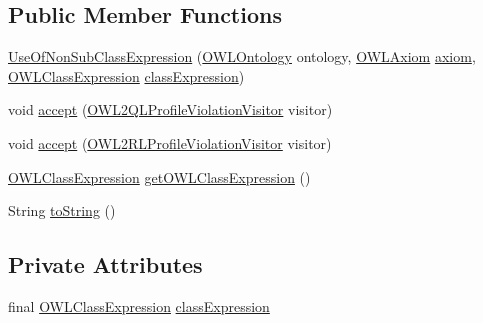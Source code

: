 \subsection*{Public Member Functions}
\begin{DoxyCompactItemize}
\item 
\hyperlink{classorg_1_1semanticweb_1_1owlapi_1_1profiles_1_1_use_of_non_sub_class_expression_aa1b02f795ea2d093cbc98c550f2ffc70}{Use\-Of\-Non\-Sub\-Class\-Expression} (\hyperlink{interfaceorg_1_1semanticweb_1_1owlapi_1_1model_1_1_o_w_l_ontology}{O\-W\-L\-Ontology} ontology, \hyperlink{interfaceorg_1_1semanticweb_1_1owlapi_1_1model_1_1_o_w_l_axiom}{O\-W\-L\-Axiom} \hyperlink{classorg_1_1semanticweb_1_1owlapi_1_1profiles_1_1_o_w_l_profile_violation_aa7c8e8910ed3966f64a2c003fb516214}{axiom}, \hyperlink{interfaceorg_1_1semanticweb_1_1owlapi_1_1model_1_1_o_w_l_class_expression}{O\-W\-L\-Class\-Expression} \hyperlink{classorg_1_1semanticweb_1_1owlapi_1_1profiles_1_1_use_of_non_sub_class_expression_a2904972a1c2a259d708005626ba9ff31}{class\-Expression})
\item 
void \hyperlink{classorg_1_1semanticweb_1_1owlapi_1_1profiles_1_1_use_of_non_sub_class_expression_a9051a12d41db68d4b911ec3e074b9022}{accept} (\hyperlink{interfaceorg_1_1semanticweb_1_1owlapi_1_1profiles_1_1_o_w_l2_q_l_profile_violation_visitor}{O\-W\-L2\-Q\-L\-Profile\-Violation\-Visitor} visitor)
\item 
void \hyperlink{classorg_1_1semanticweb_1_1owlapi_1_1profiles_1_1_use_of_non_sub_class_expression_abd322abca89ccbbec465c7fd32077238}{accept} (\hyperlink{interfaceorg_1_1semanticweb_1_1owlapi_1_1profiles_1_1_o_w_l2_r_l_profile_violation_visitor}{O\-W\-L2\-R\-L\-Profile\-Violation\-Visitor} visitor)
\item 
\hyperlink{interfaceorg_1_1semanticweb_1_1owlapi_1_1model_1_1_o_w_l_class_expression}{O\-W\-L\-Class\-Expression} \hyperlink{classorg_1_1semanticweb_1_1owlapi_1_1profiles_1_1_use_of_non_sub_class_expression_a2ebc835b03217cfafe01b2c84308292d}{get\-O\-W\-L\-Class\-Expression} ()
\item 
String \hyperlink{classorg_1_1semanticweb_1_1owlapi_1_1profiles_1_1_use_of_non_sub_class_expression_ade6ecfb94bea72cea20ae3f1aacc0d6f}{to\-String} ()
\end{DoxyCompactItemize}
\subsection*{Private Attributes}
\begin{DoxyCompactItemize}
\item 
final \hyperlink{interfaceorg_1_1semanticweb_1_1owlapi_1_1model_1_1_o_w_l_class_expression}{O\-W\-L\-Class\-Expression} \hyperlink{classorg_1_1semanticweb_1_1owlapi_1_1profiles_1_1_use_of_non_sub_class_expression_a2904972a1c2a259d708005626ba9ff31}{class\-Expression}
\end{DoxyCompactItemize}


